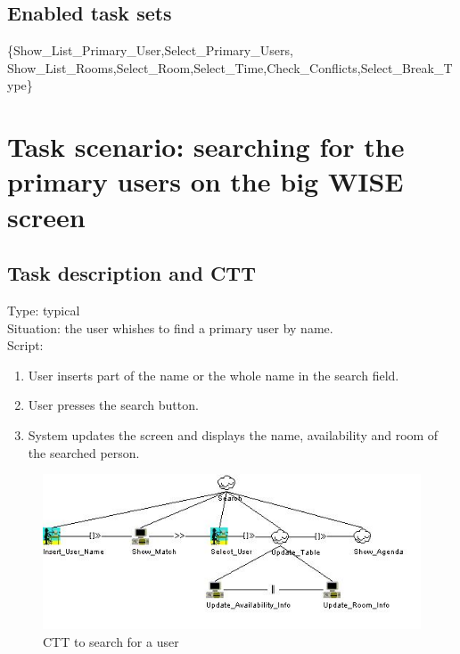 \documentclass[11pt, a4paper,svglistings]{report}
\begin{document}
\subsection{Enabled task sets}

\{Show\_List\_Primary\_User,Select\_Primary\_Users, \\ Show\_List\_Rooms,Select\_Room,Select\_Time,Check\_Conflicts,Select\_Break\_Type\}


\newpage

\section{Task scenario: searching for the primary users on the big WISE screen}

\subsection{Task description and CTT}

\label{subsec:alphabetic}Type: typical \\
Situation: the user whishes to find a primary user by name. \\
Script:
\begin{enumerate}
\item User inserts part of the name or the whole name in the search field.
\item User presses the search button.
\item System updates the screen and displays the name, availability and room of the searched 
person.
\end{enumerate}

\begin{figure}[H]
\centering
    \includegraphics[width=1\textwidth]{Search_User.jpg}
  \caption[Search a user CTT]{\label{fig:SearchUser}CTT to search for a user}
\end{figure}
\end{document}
